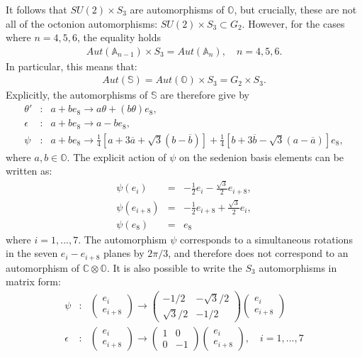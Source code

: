 \documentclass{article}
\newcommand{\bb}[1]{\mathbb{#1}}
\begin{document}
It follows that $SU(2)\times S_3$ are automorphisms of $\bb{O}$, but crucially, these are not all of the octonion automorphisms: $SU(2)\times S_3\subset G_2$. However, for the cases where $n=4,5,6$, the equality holds \cite{brown1967generalized}
\begin{eqnarray}
Aut(\bb{A}_{n-1})\times S_3= Aut(\bb{A}_n),\quad n=4,5,6.
\end{eqnarray}
In particular, this means that:
\begin{eqnarray}
Aut(\bb{S})=Aut(\bb{O})\times S_3=G_2\times S_3.
\end{eqnarray}
Explicitly, the automorphisms of $\bb{S}$ are therefore give by
\begin{eqnarray}
\theta'&:& a+be_8\rightarrow a\theta+(b\theta)e_8,\\
\epsilon&:& a+be_8\rightarrow a-be_8,\\
\psi&:& a+be_8\rightarrow \frac{1}{4}[a+3\overline{a}+\sqrt{3}(b-\overline{b})]+\frac{1}{4}[b+3\overline{b}-\sqrt{3}(a-\overline{a})]e_8,
\end{eqnarray}
where $a,b\in\bb{O}$.
The explicit action of $\psi$ on the sedenion basis elements can be written as:
\begin{eqnarray}
       \psi(e_i)&=& -\frac{1}{2}e_i-\frac{\sqrt{3}}{2}e_{i+8},\\
       \psi(e_{i+8})&=& -\frac{1}{2}e_{i+8}+\frac{\sqrt{3}}{2}e_i,\\
       \psi(e_8)&=&e_8
\end{eqnarray}
where $i=1,...,7$. The automorphism $\psi$ corresponds to a simultaneous rotations in the seven $e_i-e_{i+8}$ planes by $2\pi/3$, and therefore does not correspond to an automorphism of $\bb{C}\otimes\bb{O}$. It is also possible to write the $S_3$ automorphisms in matrix form:
\begin{eqnarray}
\psi&:& \begin{pmatrix}
    e_i\\
    e_{i+8}
\end{pmatrix}\rightarrow\begin{pmatrix}
    -1/2 & -\sqrt{3}/2\\
    \sqrt{3}/2 & -1/2
\end{pmatrix}\begin{pmatrix}
    e_i\\
    e_{i+8}
\end{pmatrix}\\
\epsilon&:& \begin{pmatrix}
    e_i\\
    e_{i+8}
\end{pmatrix}\rightarrow\begin{pmatrix}
    1 & 0\\
    0 & -1
\end{pmatrix}\begin{pmatrix}
    e_i\\
    e_{i+8}
\end{pmatrix},\quad i=1,...,7
\end{eqnarray}
\end{document}
